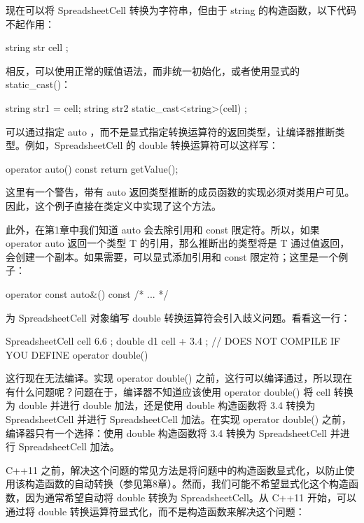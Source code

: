 现在可以将 SpreadsheetCell 转换为字符串，但由于 string 的构造函数，以下代码不起作用：

\begin{cpp}
string str { cell };
\end{cpp}

相反，可以使用正常的赋值语法，而非统一初始化，或者使用显式的 static\_cast()：

\begin{cpp}
string str1 = cell;
string str2 { static_cast<string>(cell) };
\end{cpp}



可以通过指定 auto ，而不是显式指定转换运算符的返回类型，让编译器推断类型。例如，SpreadsheetCell 的 double 转换运算符可以这样写：

\begin{cpp}
operator auto() const { return getValue(); }
\end{cpp}

这里有一个警告，带有 auto 返回类型推断的成员函数的实现必须对类用户可见。因此，这个例子直接在类定义中实现了这个方法。

此外，在第1章中我们知道 auto 会去除引用和 const 限定符。所以，如果 operator auto 返回一个类型 T 的引用，那么推断出的类型将是 T 通过值返回，会创建一个副本。如果需要，可以显式添加引用和 const 限定符；这里是一个例子：

\begin{cpp}
operator const auto&() const { /* ... */ }
\end{cpp}


为 SpreadsheetCell 对象编写 double 转换运算符会引入歧义问题。看看这一行：

\begin{cpp}
SpreadsheetCell cell { 6.6 };
double d1 { cell + 3.4 }; // DOES NOT COMPILE IF YOU DEFINE operator double()
\end{cpp}

这行现在无法编译。实现 operator double() 之前，这行可以编译通过，所以现在有什么问题呢？问题在于，编译器不知道应该使用 operator double() 将 cell 转换为 double 并进行 double 加法，还是使用 double 构造函数将 3.4 转换为 SpreadsheetCell 并进行 SpreadsheetCell 加法。在实现 operator double() 之前，编译器只有一个选择：使用 double 构造函数将 3.4 转换为 SpreadsheetCell 并进行 SpreadsheetCell 加法。

C++11 之前，解决这个问题的常见方法是将问题中的构造函数显式化，以防止使用该构造函数的自动转换（参见第8章）。然而，我们可能不希望显式化这个构造函数，因为通常希望自动将 double 转换为 SpreadsheetCell。从 C++11 开始，可以通过将 double 转换运算符显式化，而不是构造函数来解决这个问题：

